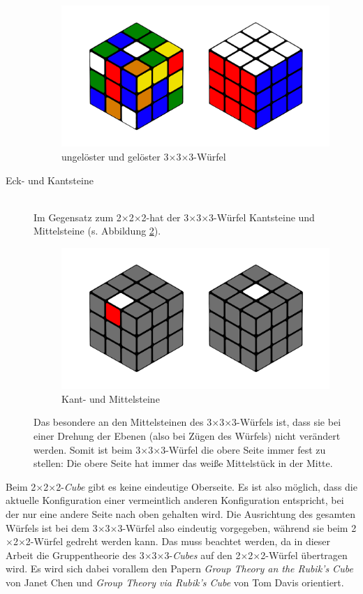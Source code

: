 \documentclass[12pt,a4paper, usenames, dvipsnames]{article}
\newcommand{\Ttwo}{2$\times$2$\times$2-}
\newcommand{\Tthree}{3$\times$3$\times$3-}
\begin{document}
\begin{description}
\begin{figure}[h]
\centering
\includegraphics[scale=0.11]{3x3_sc_so.png}
\caption[ungelöster und gelöster \Tthree Würfel]{ungelöster und gelöster \Tthree Würfel}
\label{5}
\end{figure}

\newpage
\item[Eck- und Kantsteine] \ \\
Im Gegensatz zum \Ttwo hat der \Tthree Würfel Kantsteine und Mittelsteine (s. Abbildung \ref{6}).
\begin{figure}[h]
\centering
\includegraphics[scale=0.11]{mittelkant.png}
\caption[Kant- und Mittelsteine]{Kant- und Mittelsteine}
\label{6}
\end{figure}
Das besondere an den Mittelsteinen des \Tthree Würfels ist, dass sie bei einer Drehung der Ebenen (also bei Zügen des Würfels) nicht verändert werden. Somit ist beim \Tthree Würfel die obere Seite immer fest zu stellen: Die obere Seite hat immer das weiße Mittelstück in der Mitte. 


\end{description}

Beim \Ttwo \textit{Cube} gibt es keine eindeutige Oberseite. Es ist also möglich, dass die aktuelle Konfiguration einer vermeintlich anderen Konfiguration entspricht, bei der nur eine andere Seite nach oben gehalten wird.
Die Ausrichtung des gesamten Würfels ist bei dem \Tthree Würfel also eindeutig vorgegeben, während sie beim \Ttwo Würfel gedreht werden kann.  
Das muss beachtet werden, da in dieser Arbeit die Gruppentheorie des \Tthree \textit{Cubes} auf den \Ttwo Würfel übertragen wird. Es wird sich dabei vorallem den Papern \textit{Group Theory an the Rubik's Cube} von Janet Chen \cite{JC} und \textit{Group Theory via Rubik's Cube} von Tom Davis \cite{TD} orientiert.
\end{document}
